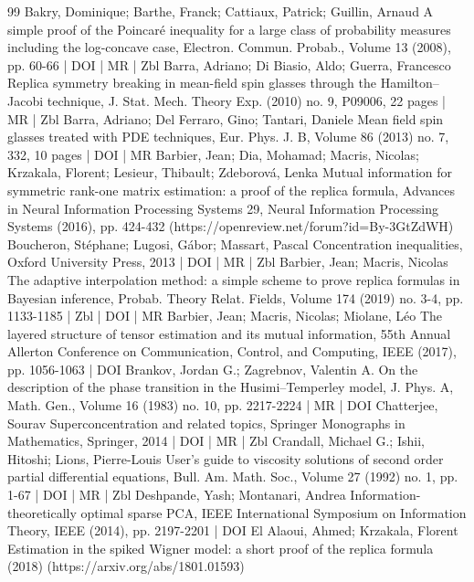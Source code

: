\begin{thebibliography}{99}
Bakry, Dominique; Barthe, Franck; Cattiaux, Patrick; Guillin, Arnaud A simple proof of the Poincaré inequality for a large class of probability measures including the log-concave case, Electron. Commun. Probab., Volume 13 (2008), pp. 60-66 | DOI | MR | Zbl
Barra, Adriano; Di Biasio, Aldo; Guerra, Francesco Replica symmetry breaking in mean-field spin glasses through the Hamilton–Jacobi technique, J. Stat. Mech. Theory Exp. (2010) no. 9, P09006, 22 pages | MR | Zbl
Barra, Adriano; Del Ferraro, Gino; Tantari, Daniele Mean field spin glasses treated with PDE techniques, Eur. Phys. J. B, Volume 86 (2013) no. 7, 332, 10 pages | DOI | MR
Barbier, Jean; Dia, Mohamad; Macris, Nicolas; Krzakala, Florent; Lesieur, Thibault; Zdeborová, Lenka Mutual information for symmetric rank-one matrix estimation: a proof of the replica formula, Advances in Neural Information Processing Systems 29, Neural Information Processing Systems (2016), pp. 424-432 (https://openreview.net/forum?id=By-3GtZdWH)
Boucheron, Stéphane; Lugosi, Gábor; Massart, Pascal Concentration inequalities, Oxford University Press, 2013 | DOI | MR | Zbl
Barbier, Jean; Macris, Nicolas The adaptive interpolation method: a simple scheme to prove replica formulas in Bayesian inference, Probab. Theory Relat. Fields, Volume 174 (2019) no. 3-4, pp. 1133-1185 | Zbl | DOI | MR
Barbier, Jean; Macris, Nicolas; Miolane, Léo The layered structure of tensor estimation and its mutual information, 55th Annual Allerton Conference on Communication, Control, and Computing, IEEE (2017), pp. 1056-1063 | DOI
Brankov, Jordan G.; Zagrebnov, Valentin A. On the description of the phase transition in the Husimi–Temperley model, J. Phys. A, Math. Gen., Volume 16 (1983) no. 10, pp. 2217-2224 | MR | DOI
Chatterjee, Sourav Superconcentration and related topics, Springer Monographs in Mathematics, Springer, 2014 | DOI | MR | Zbl
Crandall, Michael G.; Ishii, Hitoshi; Lions, Pierre-Louis User’s guide to viscosity solutions of second order partial differential equations, Bull. Am. Math. Soc., Volume 27 (1992) no. 1, pp. 1-67 | DOI | MR | Zbl
Deshpande, Yash; Montanari, Andrea Information-theoretically optimal sparse PCA, IEEE International Symposium on Information Theory, IEEE (2014), pp. 2197-2201 | DOI
El Alaoui, Ahmed; Krzakala, Florent Estimation in the spiked Wigner model: a short proof of the replica formula (2018) (https://arxiv.org/abs/1801.01593)

\end{thebibliography}
